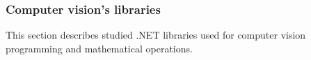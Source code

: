\documentclass[../../../../main]{subfiles}
\begin{document}
\subsubsection{Computer vision's libraries}

This section describes studied .NET libraries used for computer vision programming and mathematical operations.


\newpage


\newpage


\newpage
\end{document}
